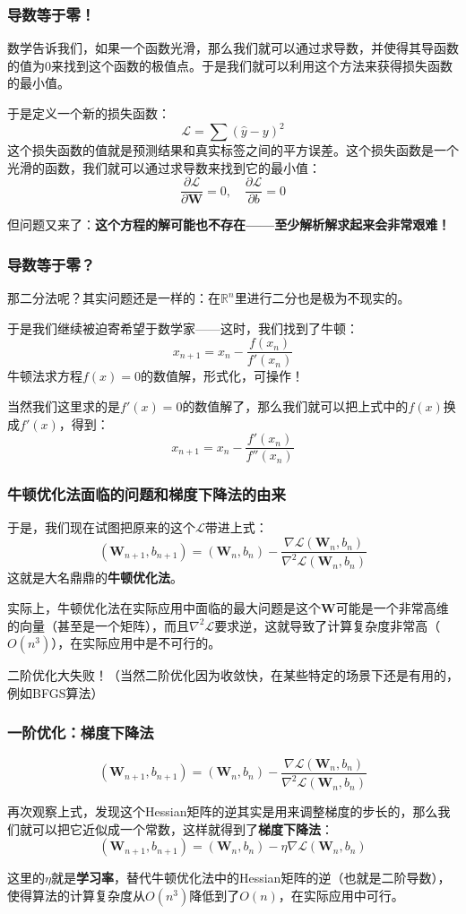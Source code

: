 \documentclass{ctexbeamer}
\begin{document}
\begin{frame}
    \frametitle{导数等于零！}

    数学告诉我们，如果一个函数光滑，那么我们就可以通过求导数，并使得其导函数的值为0来找到这个函数的极值点。于是我们就可以利用这个方法来获得损失函数的最小值。

    于是定义一个新的损失函数：
    \[ \mathcal{L} = \sum (\hat{y} - y)^2 \]
    这个损失函数的值就是预测结果和真实标签之间的平方误差。这个损失函数是一个光滑的函数，我们就可以通过求导数来找到它的最小值：
    \[\frac{\partial \mathcal{L}}{\partial \mathbf{W}} = 0, \quad \frac{\partial \mathcal{L}}{\partial b} = 0\]

    但问题又来了：\textbf{这个方程的解可能也不存在——至少解析解求起来会非常艰难！}

\end{frame}

\begin{frame}
    \frametitle{导数等于零？}

    那二分法呢？其实问题还是一样的：在$\mathbb{R}^n$里进行二分也是极为不现实的。

    于是我们继续被迫寄希望于数学家——这时，我们找到了牛顿：
    \[x_{n+1} = x_n - \frac{f(x_n)}{f'(x_n)}\]
    牛顿法求方程$f(x) = 0$的数值解，形式化，可操作！

    当然我们这里求的是$f'(x) = 0$的数值解了，那么我们就可以把上式中的$f(x)$换成$f'(x)$，得到：
    \[x_{n+1} = x_n - \frac{f'(x_n)}{f''(x_n)}\]

\end{frame}

\begin{frame}
    \frametitle{牛顿优化法面临的问题和梯度下降法的由来}

    于是，我们现在试图把原来的这个$\mathcal{L}$带进上式：
    \[(\mathbf{W}_{n+1}, b_{n+1}) = (\mathbf{W}_n, b_n) - \frac{\nabla \mathcal{L}(\mathbf{W}_n, b_n)}{\nabla^2 \mathcal{L}(\mathbf{W}_n, b_n)}\]
    这就是大名鼎鼎的\textbf{牛顿优化法}。

    实际上，牛顿优化法在实际应用中面临的最大问题是这个$\mathbf{W}$可能是一个非常高维的向量（甚至是一个矩阵），而且$\nabla^2 \mathcal{L}$要求逆，这就导致了计算复杂度非常高（$O(n^3)$），在实际应用中是不可行的。

    二阶优化大失败！（当然二阶优化因为收敛快，在某些特定的场景下还是有用的，例如BFGS算法）

\end{frame}

\begin{frame}
    \frametitle{一阶优化：梯度下降法}
    \[(\mathbf{W}_{n+1}, b_{n+1}) = (\mathbf{W}_n, b_n) - \frac{\nabla \mathcal{L}(\mathbf{W}_n, b_n)}{\nabla^2 \mathcal{L}(\mathbf{W}_n, b_n)}\]

    再次观察上式，发现这个Hessian矩阵的逆其实是用来调整梯度的步长的，那么我们就可以把它近似成一个常数，这样就得到了\textbf{梯度下降法}：
    \[(\mathbf{W}_{n+1}, b_{n+1}) = (\mathbf{W}_n, b_n) - \eta \nabla \mathcal{L}(\mathbf{W}_n, b_n)\]

    这里的$\eta$就是\textbf{学习率}，替代牛顿优化法中的Hessian矩阵的逆（也就是二阶导数），使得算法的计算复杂度从$O(n^3)$降低到了$O(n)$，在实际应用中可行。

\end{frame}
\end{document}
